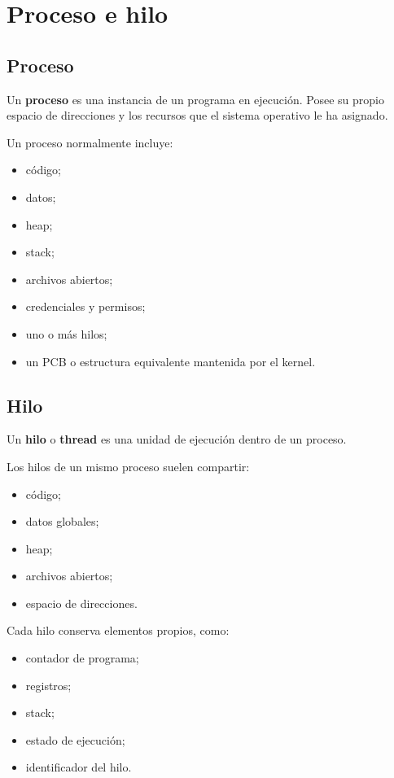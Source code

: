 \documentclass[
  spanish,
  letterpaper,
]{scrbook}
\providecommand{\tightlist}{%
  \setlength{\itemsep}{0pt}\setlength{\parskip}{0pt}}
\begin{document}

\chapter{Proceso e hilo}\label{proceso-e-hilo}

\section{Proceso}\label{proceso}

Un \textbf{proceso} es una instancia de un programa en ejecución. Posee
su propio espacio de direcciones y los recursos que el sistema operativo
le ha asignado.

Un proceso normalmente incluye:

\begin{itemize}
\tightlist
\item
  código;
\item
  datos;
\item
  heap;
\item
  stack;
\item
  archivos abiertos;
\item
  credenciales y permisos;
\item
  uno o más hilos;
\item
  un PCB o estructura equivalente mantenida por el kernel.
\end{itemize}

\section{Hilo}\label{hilo}

Un \textbf{hilo} o \textbf{thread} es una unidad de ejecución dentro de
un proceso.

Los hilos de un mismo proceso suelen compartir:

\begin{itemize}
\tightlist
\item
  código;
\item
  datos globales;
\item
  heap;
\item
  archivos abiertos;
\item
  espacio de direcciones.
\end{itemize}

Cada hilo conserva elementos propios, como:

\begin{itemize}
\tightlist
\item
  contador de programa;
\item
  registros;
\item
  stack;
\item
  estado de ejecución;
\item
  identificador del hilo.
\end{itemize}
\end{document}
